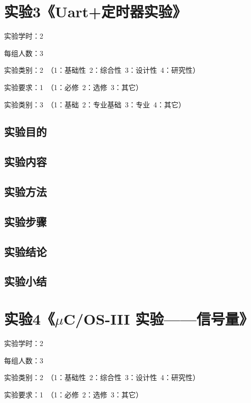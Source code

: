 ﻿\documentclass[UTF8,12pt]{article}
\begin{document}
\newpage

\section{实验3《Uart+定时器实验》}

实验学时：2

每组人数：3

实验类别：2\ （1：基础性\ 2：综合性\ 3：设计性\ 4：研究性）

实验要求：1\ （1：必修\ 2：选修\ 3：其它）

实验类别：3\ （1：基础\ 2：专业基础\ 3：专业\ 4：其它）

\subsection{实验目的}

\subsection{实验内容}

\subsection{实验方法}

\subsection{实验步骤}

\subsection{实验结论}

\subsection{实验小结}

\newpage

\section{实验4《$\mu$C/OS-III 实验——信号量》}

实验学时：2

每组人数：3

实验类别：2\ （1：基础性\ 2：综合性\ 3：设计性\ 4：研究性）

实验要求：1\ （1：必修\ 2：选修\ 3：其它）
\end{document}
